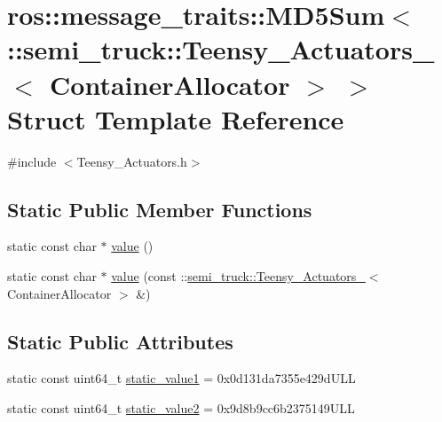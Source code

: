 \hypertarget{structros_1_1message__traits_1_1_m_d5_sum_3_01_1_1semi__truck_1_1_teensy___actuators___3_01_container_allocator_01_4_01_4}{}\section{ros\+:\+:message\+\_\+traits\+:\+:M\+D5\+Sum$<$ \+:\+:semi\+\_\+truck\+:\+:Teensy\+\_\+\+Actuators\+\_\+$<$ Container\+Allocator $>$ $>$ Struct Template Reference}
\label{structros_1_1message__traits_1_1_m_d5_sum_3_01_1_1semi__truck_1_1_teensy___actuators___3_01_container_allocator_01_4_01_4}


{\ttfamily \#include $<$Teensy\+\_\+\+Actuators.\+h$>$}

\subsection*{Static Public Member Functions}
\begin{DoxyCompactItemize}
\item 
static const char $\ast$ \hyperlink{structros_1_1message__traits_1_1_m_d5_sum_3_01_1_1semi__truck_1_1_teensy___actuators___3_01_container_allocator_01_4_01_4_a13758bc5f7f2d9783a28af50ec67affe}{value} ()
\item 
static const char $\ast$ \hyperlink{structros_1_1message__traits_1_1_m_d5_sum_3_01_1_1semi__truck_1_1_teensy___actuators___3_01_container_allocator_01_4_01_4_ac7a5562fb2f1a6c78a7a3248b7465d6e}{value} (const \+::\hyperlink{structsemi__truck_1_1_teensy___actuators__}{semi\+\_\+truck\+::\+Teensy\+\_\+\+Actuators\+\_\+}$<$ Container\+Allocator $>$ \&)
\end{DoxyCompactItemize}
\subsection*{Static Public Attributes}
\begin{DoxyCompactItemize}
\item 
static const uint64\+\_\+t \hyperlink{structros_1_1message__traits_1_1_m_d5_sum_3_01_1_1semi__truck_1_1_teensy___actuators___3_01_container_allocator_01_4_01_4_a3b7b6fb0b62486fc31e42a45a16fd3c1}{static\+\_\+value1} = 0x0d131da7355e429d\+U\+LL
\item 
static const uint64\+\_\+t \hyperlink{structros_1_1message__traits_1_1_m_d5_sum_3_01_1_1semi__truck_1_1_teensy___actuators___3_01_container_allocator_01_4_01_4_a9fd6a5beaa08b9601b1f2af0f1528164}{static\+\_\+value2} = 0x9d8b9cc6b2375149\+U\+LL
\end{DoxyCompactItemize}


